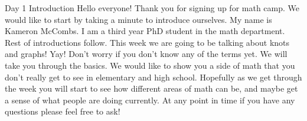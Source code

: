 \documentclass{article}
\begin{document}
\begin{section}{Day 1 Introduction}
Hello everyone! Thank you for signing up for math camp. We would like to start by taking a minute to introduce ourselves. My name is Kameron McCombs. I am a third year PhD student in the math department. Rest of introductions follow. This week we are going to be talking about knots and graphs! Yay! Don't worry if you don't know any of the terms yet. We will take you through the basics. We would like to show you a side of math that you don't really get to see in elementary and high school. Hopefully as we get through the week you will start to see how different areas of math can be, and maybe get a sense of what people are doing currently. At any point in time if you have any questions please feel free to ask!

\end{section}
\end{document}
